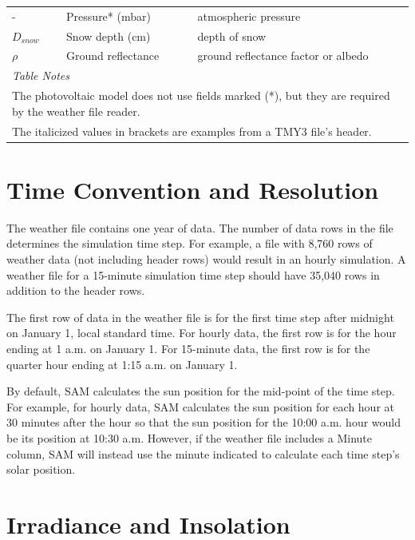 \documentclass[12pt,letterpaper]{article}
\begin{document}
\begin{table}
\begin{center}
\begin{tabular}{lll}
- & Pressure* (mbar) & atmospheric pressure \\
$D_{snow}$ & Snow depth (cm) & depth of snow \\
$\mathit{\rho}$ & Ground reflectance & ground reflectance factor or albedo \\
\midrule
\multicolumn{3}{l}{\textit{Table Notes}}\\
\multicolumn{3}{l}{The photovoltaic model does not use fields marked (*), but they are required by the weather file reader.}\\
\multicolumn{3}{l}{The italicized values in brackets are examples from a TMY3 file's header.}\\
\end{tabular}
\label{tab-wfdata}
\end{center}
\end{table}

\section{Time Convention and Resolution}

The weather file contains one year of data. The number of data rows in the file determines the simulation time step. For example, a file with 8,760 rows of weather data (not including header rows) would result in an hourly simulation. A weather file for a 15-minute simulation time step should have 35,040 rows in addition to the header rows.

The first row of data in the weather file is for the first time step after midnight on January 1, local standard time. For hourly data, the first row is for the hour ending at 1 a.m. on January 1. For 15-minute data, the first row is for the quarter hour ending at 1:15 a.m. on January 1.

By default, SAM calculates the sun position for the mid-point of the time step. For example, for hourly data, SAM calculates the sun position for each hour at 30 minutes after the hour so that the sun position for the 10:00 a.m. hour would be its position at 10:30 a.m. However, if the weather file includes a Minute column, SAM will instead use the minute indicated to calculate each time step's solar position.

\section{Irradiance and Insolation}

\end{document}
